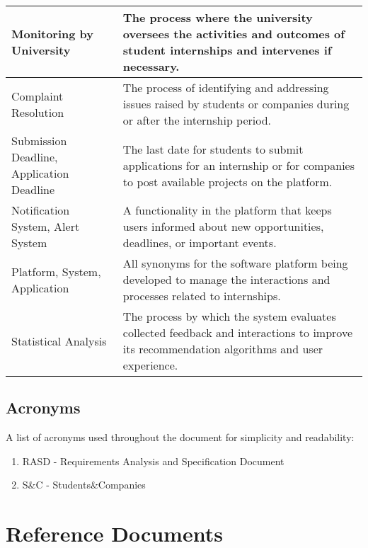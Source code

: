 \begin{longtable}{|p{}|p{}|}
    \hline
    Monitoring by University & The process where the university oversees the activities and outcomes of student internships and intervenes if necessary. \\
    \hline
    Complaint Resolution & The process of identifying and addressing issues raised by students or companies during or after the internship period. \\
    \hline
    Submission Deadline, Application Deadline & The last date for students to submit applications for an internship or for companies to post available projects on the platform. \\
    \hline
    Notification System, Alert System & A functionality in the platform that keeps users informed about new opportunities, deadlines, or important events. \\
    \hline
    Platform, System, Application & All synonyms for the software platform being developed to manage the interactions and processes related to internships. \\
    \hline
    Statistical Analysis & The process by which the system evaluates collected feedback and interactions to improve its recommendation algorithms and user experience. \\
    \hline
    
\end{longtable}

\subsection{Acronyms}

A list of acronyms used throughout the document for simplicity and readability:

\begin{enumerate}
    \item RASD - Requirements Analysis and Specification Document
    \item S\&C - Students\&Companies
\end{enumerate}

\newpage
\section{Reference Documents}

